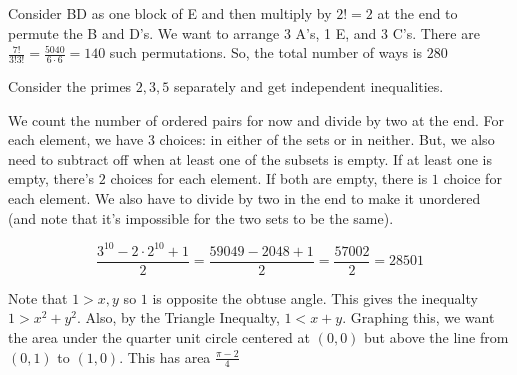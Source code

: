 \documentclass[11pt]{article}
\begin{document}
\begin{sol} 
Consider BD as one block of E and then multiply by $2!=2$ at the end to permute the B and D's. We want to arrange 3 A's, 1 E, and 3 C's. There are $\frac{7!}{3!3!}=\frac{5040}{6\cdot 6}=140$ such permutations. So, the total number of ways is $\boxed{280}$
\end{sol}


\begin{sol}
 Consider the primes $2,3,5$ separately and get independent inequalities.
\end{sol}




\begin{sol} 
We count the number of ordered pairs for now and divide by two at the end. For each element, we have $3$ choices: in either of the sets or in neither. But, we also need to subtract off when at least one of the subsets is empty. If at least one is empty, there's $2$ choices for each element. If both are empty, there is $1$ choice for each element. We also have to divide by two in the end to make it unordered (and note that it's impossible for the two sets to be the same). 

$$\frac{3^{10}-2\cdot 2^{10}+1}{2} = \frac{59049-2048+1}{2}=\frac{57002}{2}=28\boxed{501}$$
\end{sol} 


\begin{sol} 
Note that $1>x,y$ so $1$ is opposite the obtuse angle. This gives the inequalty $1>x^2+y^2$. Also, by the Triangle Inequalty, $1 < x+y$. Graphing this, we want the area under the quarter unit circle centered at $(0,0)$ but above the line from $(0,1)$ to $(1,0)$. This has area $\boxed{\frac{\pi-2}{4}}$
\end{sol}
\end{document}
